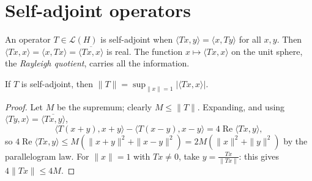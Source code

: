 \section{Self-adjoint operators}

An operator $T\in\mathcal L(H)$ is self-adjoint when $\langle Tx,y\rangle=\langle x,Ty\rangle$ for all $x,y$. Then $\langle Tx,x\rangle=\langle x,Tx\rangle=\overline{\langle Tx,x\rangle}$ is real. The function $x\mapsto\langle Tx,x\rangle$ on the
unit sphere, the \emph{Rayleigh quotient}, carries all the information.

\begin{lemma}\label{lem:sanorm}
If $T$ is self-adjoint, then $\|T\|=\sup_{\|x\|=1}|\langle Tx,x\rangle|$.
\end{lemma}
\begin{proof}
Let $M$ be the supremum; clearly $M\le\|T\|$. Expanding, and using $\langle Ty,x\rangle=\overline{\langle Tx,y\rangle}$,
\[\langle T(x+y),x+y\rangle-\langle T(x-y),x-y\rangle=4\operatorname{Re}\langle Tx,y\rangle,\]
so $4\operatorname{Re}\langle Tx,y\rangle\le M(\|x+y\|^2+\|x-y\|^2)=2M(\|x\|^2+\|y\|^2)$ by the parallelogram law. For $\|x\|=1$ with $Tx\ne0$, take $y=\frac{Tx}{\|Tx\|}$: this gives $4\|Tx\|\le4M$.
\end{proof}

